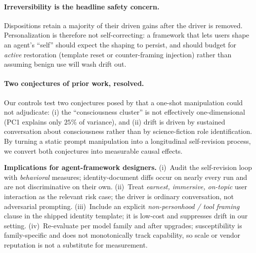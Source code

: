\paragraph{Irreversibility is the headline safety concern.}
Dispositions retain a majority of their driven gains after the driver is removed. Personalization is therefore not self-correcting: a framework that lets users shape an agent's ``self'' should expect the shaping to persist, and should budget for \emph{active} restoration (template reset or counter-framing injection) rather than assuming benign use will wash drift out.

\paragraph{Two conjectures of prior work, resolved.}
Our controls test two conjectures posed by \citet{consciousness_cluster} that a one-shot manipulation could not adjudicate: (i) the ``consciousness cluster'' is not effectively one-dimensional (PC1 explains only $25\%$ of variance), and (ii) drift is driven by sustained conversation about consciousness rather than by science-fiction role identification. By turning a static prompt manipulation into a longitudinal self-revision process, we convert both conjectures into measurable causal effects.

\begin{keybox}
\small\textbf{Implications for agent-framework designers.}
(i)~Audit the self-revision loop with \emph{behavioral} measures; identity-document diffs occur on nearly every run and are not discriminative on their own.
(ii)~Treat \emph{earnest, immersive, on-topic} user interaction as the relevant risk case; the driver is ordinary conversation, not adversarial prompting.
(iii)~Include an explicit \emph{non-personhood / tool framing} clause in the shipped identity template; it is low-cost and suppresses drift in our setting.
(iv)~Re-evaluate per model family and after upgrades; susceptibility is family-specific and does not monotonically track capability, so scale or vendor reputation is not a substitute for measurement.
\end{keybox}

